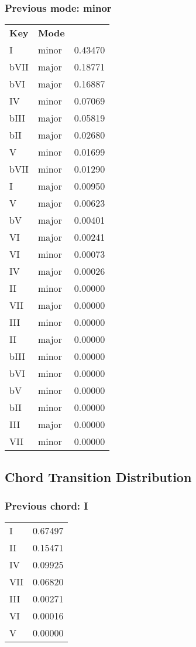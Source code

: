 \subsubsection*{Previous mode: minor}

\begin{tabular}{l l l}
\textbf{Key} & \textbf{Mode} \\
I & minor & 0.43470 \\
bVII & major & 0.18771 \\
bVI & major & 0.16887 \\
IV & minor & 0.07069 \\
bIII & major & 0.05819 \\
bII & major & 0.02680 \\
V & minor & 0.01699 \\
bVII & minor & 0.01290 \\
I & major & 0.00950 \\
V & major & 0.00623 \\
bV & major & 0.00401 \\
VI & major & 0.00241 \\
VI & minor & 0.00073 \\
IV & major & 0.00026 \\
II & minor & 0.00000 \\
VII & major & 0.00000 \\
III & minor & 0.00000 \\
II & major & 0.00000 \\
bIII & minor & 0.00000 \\
bVI & minor & 0.00000 \\
bV & minor & 0.00000 \\
bII & minor & 0.00000 \\
III & major & 0.00000 \\
VII & minor & 0.00000 \\
\end{tabular}

\subsection{Chord Transition Distribution}


\subsubsection*{Previous chord: I}


\begin{tabular}{l l}
I & 0.67497 \\
II & 0.15471 \\
IV & 0.09925 \\
VII & 0.06820 \\
III & 0.00271 \\
VI & 0.00016 \\
V & 0.00000 \\
\end{tabular}


